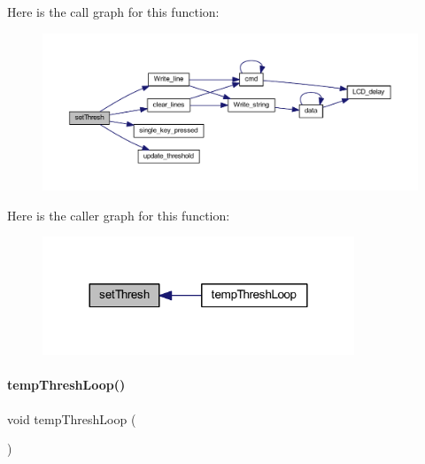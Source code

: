 Here is the call graph for this function\+:
\nopagebreak
\begin{figure}[H]
\begin{center}
\leavevmode
\includegraphics[width=350pt]{a00053_a934f0cdada5e3c3460026cb93ed2c0e5_cgraph}
\end{center}
\end{figure}
Here is the caller graph for this function\+:
\nopagebreak
\begin{figure}[H]
\begin{center}
\leavevmode
\includegraphics[width=264pt]{a00053_a934f0cdada5e3c3460026cb93ed2c0e5_icgraph}
\end{center}
\end{figure}
\mbox{\label{a00053_af9c48a1dcf99ec4adcf775f6c9a15566}} 
\paragraph{temp\+Thresh\+Loop()}
{\footnotesize\ttfamily void temp\+Thresh\+Loop (\begin{DoxyParamCaption}{ }\end{DoxyParamCaption})}

